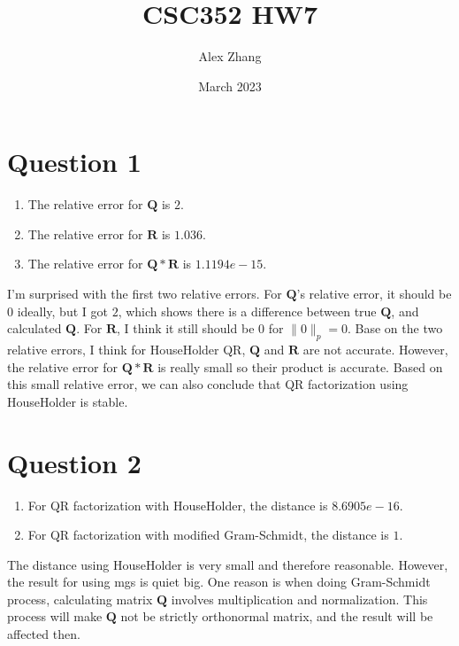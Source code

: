 \documentclass{article}
\title{CSC352 HW7}
\author{Alex Zhang}
\date{March 2023}
\newcommand{\mat}[1]{\mathbf{#1}}
\begin{document}
\maketitle

\section*{Question 1}
    \begin{enumerate}
        \item The relative error for $\mat{Q}$ is $2$.
        \item The relative error for $\mat{R}$ is $1.036$.
        \item The relative error for $\mat{Q*R}$ is $1.1194e-15$.
    \end{enumerate}
    I'm surprised with the first two relative errors. For $\mat{Q}$'s relative error, it should be $0$ ideally,
    but I got $2$, which shows there is a difference between true $\mat{Q}$, and calculated $\mat{Q}$. For $\mat{R}$, 
    I think it still should be $0$ for $\| 0\|_p = 0$. Base on the two relative errors, I think for HouseHolder QR, $\mat{Q}$ and $\mat{R}$ are not accurate.
    However, the relative error for $\mat{Q*R}$ is really small so their product is accurate. Based on this
    small relative error, we can also conclude that QR factorization using HouseHolder is stable.

\section*{Question 2}
    \begin{enumerate}
        \item For QR factorization with HouseHolder, the distance is $8.6905e-16$.
        \item For QR factorization with modified Gram-Schmidt, the distance is $1$.
    \end{enumerate}
    The distance using HouseHolder is very small and therefore reasonable. However, the result for using mgs is quiet big.
    One reason is when doing Gram-Schmidt process, calculating matrix $\mat{Q}$ involves multiplication and normalization.
    This process will make $\mat{Q}$ not be strictly orthonormal matrix, and the result will be affected then. 
\end{document}
